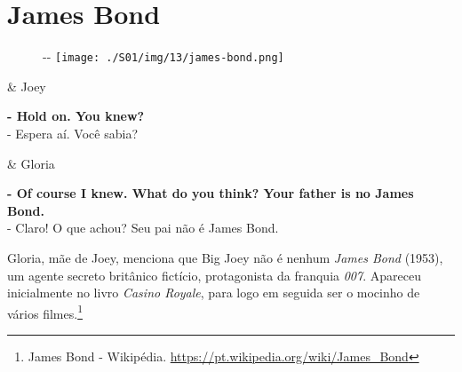 \hypertarget{james-bond}{%
\section{James Bond}\label{james-bond}}

\begin{figure}[!ht]
  \begin{adjustwidth}{-\oddsidemargin-1in}{-\rightmargin}
    \centering
    \texttt{[image: ./S01/img/13/james-bond.png]}
  \end{adjustwidth}
\end{figure}

\begin{tcolorbox}[enhanced,center upper,
    drop fuzzy shadow southeast, boxrule=0.3pt,
    lower separated=false, breakable,
    colframe=black!30!dialogoBorder,colback=white]
\begin{minipage}[c]{0.16\linewidth}
   & \centering \scriptsize{Joey}
\end{minipage}
\hfill
\begin{minipage}[c]{0.8\linewidth}
  \textbf{- Hold on. You knew?}\\
  - Espera aí. Você sabia?
\end{minipage}

\medskip
\begin{minipage}[c]{0.16\linewidth}
   & \centering \scriptsize{Gloria}
\end{minipage}
\hfill
\begin{minipage}[c]{0.8\linewidth}
  \textbf{- Of course I knew. What do you think? Your father is no James Bond.}\\
  - Claro! O que achou? Seu pai não é James Bond.
\end{minipage}
\end{tcolorbox}

Gloria, mãe de Joey, menciona que Big Joey não é nenhum \emph{James
Bond} (1953), um agente secreto britânico fictício, protagonista da
franquia \emph{007}. Apareceu inicialmente no livro \emph{Casino
Royale}, para logo em seguida ser o mocinho de vários filmes.\footnote{\sloppy James Bond - Wikipédia. \url{https://pt.wikipedia.org/wiki/James_Bond}}

